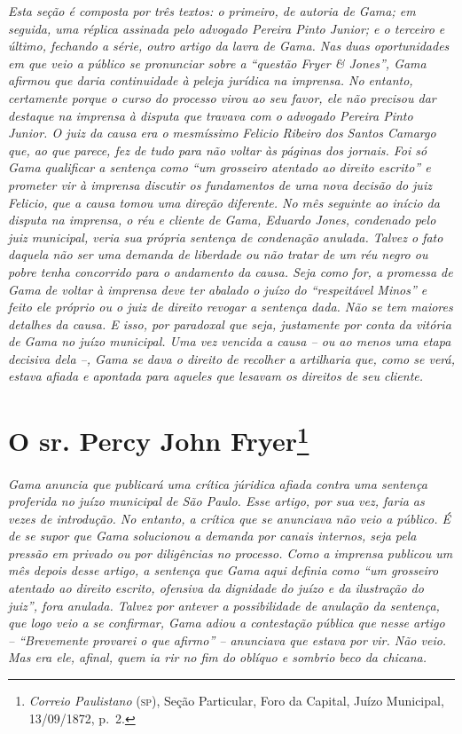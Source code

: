 \begin{argumento}
\emph{Esta seção é composta por três textos: o primeiro, de autoria de
Gama; em seguida, uma réplica assinada pelo advogado Pereira Pinto
Junior; e o terceiro e último, fechando a série, outro artigo da lavra
de Gama. Nas duas oportunidades em que veio a público se pronunciar
sobre a ``questão Fryer \& Jones'', Gama afirmou que daria continuidade à
peleja jurídica na imprensa. No entanto, certamente porque o curso do
processo virou ao seu favor, ele não precisou dar destaque na imprensa à
disputa que travava com o advogado Pereira Pinto Junior. O juiz da causa
era o mesmíssimo Felicio Ribeiro dos Santos Camargo que, ao que parece,
fez de tudo para não voltar às páginas dos jornais. Foi só Gama
qualificar a sentença como ``um grosseiro atentado ao direito escrito'' e
prometer vir à imprensa discutir os fundamentos de uma nova decisão do
juiz Felicio, que a causa tomou uma direção diferente. No mês seguinte
ao início da disputa na imprensa, o réu e cliente de Gama, Eduardo
Jones, condenado pelo juiz municipal, veria sua própria sentença de
condenação anulada. Talvez o fato daquela não ser uma demanda de
liberdade ou não tratar de um réu negro ou pobre tenha concorrido para o
andamento da causa. Seja como for, a promessa de Gama de voltar à
imprensa deve ter abalado o juízo do ``respeitável Minos'' e feito ele
próprio ou o juiz de direito revogar a sentença dada. Não se tem maiores
detalhes da causa. E isso, por paradoxal que seja, justamente por conta
da vitória de Gama no juízo municipal. Uma vez vencida a causa -- ou ao
menos uma etapa decisiva dela --, Gama se dava o direito de recolher a
artilharia que, como se verá, estava afiada e apontada para aqueles que
lesavam os direitos de seu cliente.}
\end{argumento}

\chapter{O sr. Percy John Fryer\footnote{\emph{Correio Paulistano} (\textsc{sp}), Seção Particular, Foro da Capital, Juízo Municipal, 13/09/1872, p.~2.}} %

\begin{didascalia}
\emph{Gama anuncia que publicará uma crítica júridica afiada contra uma
sentença proferida no juízo municipal de São Paulo. Esse artigo, por sua
vez, faria as vezes de introdução. No entanto, a crítica que se
anunciava não veio a público. É de se supor que Gama solucionou a
demanda por canais internos, seja pela pressão em privado ou por
diligências no processo. Como a imprensa publicou um mês depois desse
artigo, a sentença que Gama aqui definia como ``um grosseiro atentado ao
direito escrito, ofensiva da dignidade do juízo e da ilustração do
juiz'', fora anulada. Talvez por antever a possibilidade de anulação da
sentença, que logo veio a se confirmar, Gama adiou a contestação pública
que nesse artigo -- ``Brevemente provarei o que afirmo'' -- anunciava que
estava por vir. Não veio. Mas era ele, afinal, quem ia rir no fim do
oblíquo e sombrio beco da chicana.}
\end{didascalia}

